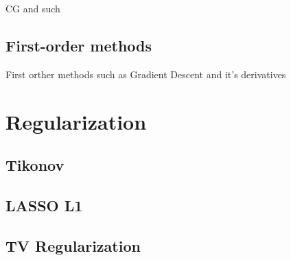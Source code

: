 CG and such

\subsection{First-order methods}\label{subsec:first_order_methods}

First orther methods such as Gradient Descent and it's derivatives

\section{Regularization}\label{sec:regularization}

\subsection{Tikonov}\label{subsec:tikhonov_regularization}

\subsection{LASSO L1}\label{subsec:l1_regularization}

\subsection{TV Regularization}\label{subsec:tv_regularization}
